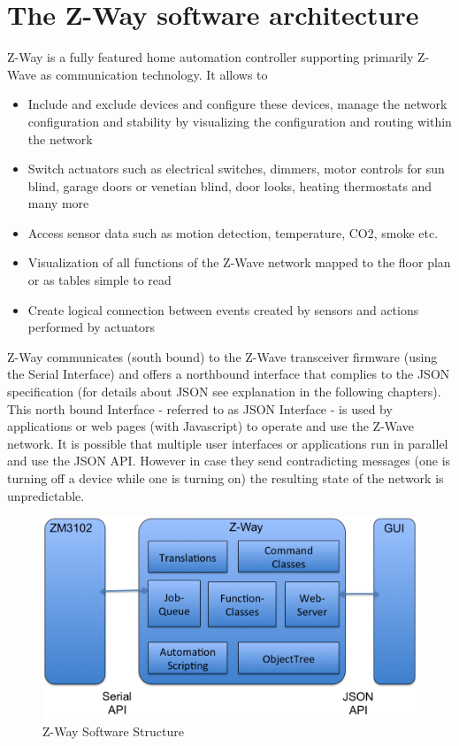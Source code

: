 \section{The Z-Way software architecture}

Z-Way is a fully featured home automation controller supporting primarily Z-Wave as 
communication technology. It allows to
\begin{itemize}
\item Include and exclude devices and configure these devices, manage the network 
configuration and stability by visualizing 
the configuration and routing within the network
\item Switch actuators such as electrical switches, dimmers, motor controls for sun blind, garage doors or venetian blind, door 
looks, heating thermostats and many more
\item Access sensor data such as motion detection, temperature, CO2, smoke etc.
\item Visualization of all functions of the Z-Wave network mapped to the floor plan or as tables simple to read
\item Create logical connection between events created by sensors and actions performed by actuators
\end{itemize}

Z-Way communicates (south bound) to the Z-Wave transceiver firmware (using the Serial Interface) and offers a 
northbound interface that complies to the JSON specification (for details about JSON see explanation in the following 
chapters).
This north bound Interface - referred to as JSON Interface - is used by applications or web pages (with Javascript)
 to operate and use the Z-Wave network. It is possible that multiple user interfaces or applications run in parallel and use the JSON 
 API. However in  case they send contradicting messages (one is turning off a device while one is turning on) the resulting
 state of the network is unpredictable. 

\begin{figure} 
\begin{center}
\includegraphics[scale=0.6]{pics/zway1en.png}
\caption{Z-Way Software Structure}
\label{zwaystructure} 
\end{center} 
\end{figure}

